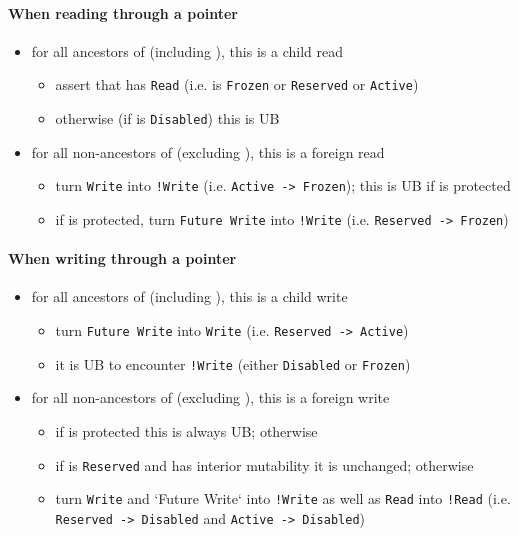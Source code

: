 \documentclass[a4paper,11pt]{article}
\theoremstyle{plain}
\theoremstyle{definition}
\theoremstyle{remark}
\newcommand{\tcode}[1]{\rstinline{#1}}
\newcommand{\tperm}[1]{\texttt{#1}}
\begin{document}
\paragraph*{When reading through a pointer \tcode{y}}
\begin{itemize}
    \item for all ancestors \tcode{x} of \tcode{y} (including \tcode{y}), this is a child read
        \begin{itemize}
            \item assert that \tcode{x} has \tperm{Read} (i.e. is \tperm{Frozen} or \tperm{Reserved} or \tperm{Active})
            \item otherwise (if \tcode{x} is \tperm{Disabled}) this is UB
        \end{itemize}
    \item for all non-ancestors \tcode{z} of \tcode{y} (excluding \tcode{y}), this is a foreign read
        \begin{itemize}
            \item turn \tperm{Write} into \tperm{!Write} (i.e. \tperm{Active -> Frozen}); this is UB if \tcode{z} is protected
            \item if \tcode{z} is protected, turn \tperm{Future Write} into \tperm{!Write} (i.e. \tperm{Reserved -> Frozen})
        \end{itemize}
\end{itemize}

\paragraph*{When writing through a pointer \tcode{y}}
\begin{itemize}
    \item for all ancestors \tcode{x} of \tcode{y} (including \tcode{y}), this is a child write
        \begin{itemize}
            \item turn \tperm{Future Write} into \tperm{Write} (i.e. \tperm{Reserved -> Active})
            \item it is UB to encounter \tperm{!Write} (either \tperm{Disabled} or \tperm{Frozen})
        \end{itemize}
    \item for all non-ancestors \tcode{z} of \tcode{y} (excluding \tcode{y}), this is a foreign write
        \begin{itemize}
            \item if \tcode{z} is protected this is always UB; otherwise
            \item if \tcode{z} is \tperm{Reserved} and has interior mutability it is unchanged; otherwise
            \item turn \tperm{Write} and `Future Write` into \tperm{!Write} as well as \tperm{Read} into \tperm{!Read}
                (i.e. \tperm{Reserved -> Disabled} and \tperm{Active -> Disabled})
        \end{itemize}
\end{itemize}
\end{document}
